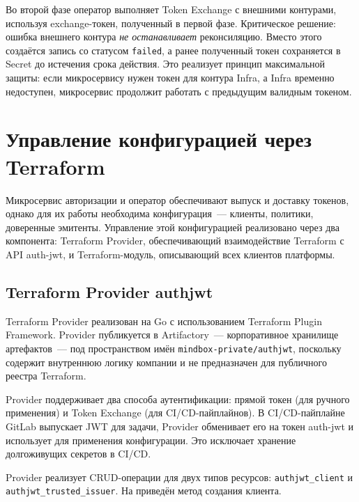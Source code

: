 Во второй фазе оператор выполняет Token Exchange с внешними контурами,
используя exchange-токен, полученный в первой фазе.
Критическое решение: ошибка внешнего контура \emph{не останавливает} реконсиляцию.
Вместо этого создаётся запись со статусом \texttt{failed},
а ранее полученный токен сохраняется в Secret до истечения срока действия.
Это реализует принцип максимальной защиты:
если микросервису нужен токен для контура Infra,
а Infra временно недоступен,
микросервис продолжит работать с предыдущим валидным токеном.

\section{Управление конфигурацией через Terraform}\label{sec:terraform-impl}

Микросервис авторизации и оператор обеспечивают выпуск и доставку токенов,
однако для их работы необходима конфигурация~---
клиенты, политики, доверенные эмитенты.
Управление этой конфигурацией
реализовано через два компонента:
Terraform Provider, обеспечивающий взаимодействие Terraform с API auth-jwt,
и Terraform-модуль, описывающий всех клиентов платформы.

\subsection{Terraform Provider authjwt}\label{subsec:tf-provider}

Terraform Provider реализован на Go
с использованием Terraform Plugin Framework.
Provider публикуется в Artifactory~---
корпоративное хранилище артефактов~---
под пространством имён \texttt{mindbox-private/authjwt},
поскольку содержит внутреннюю логику компании
и не предназначен для публичного реестра Terraform.

Provider поддерживает два способа аутентификации:
прямой токен (для ручного применения)
и Token Exchange (для CI/CD-пайплайнов).
В CI/CD-пайплайне GitLab выпускает JWT для задачи,
Provider обменивает его на токен auth-jwt
и использует для применения конфигурации.
Это исключает хранение долгоживущих секретов в CI/CD.

Provider реализует CRUD-операции для двух типов ресурсов:
\texttt{authjwt\_client} и \texttt{authjwt\_trusted\_issuer}.
На  приведён метод создания клиента.

